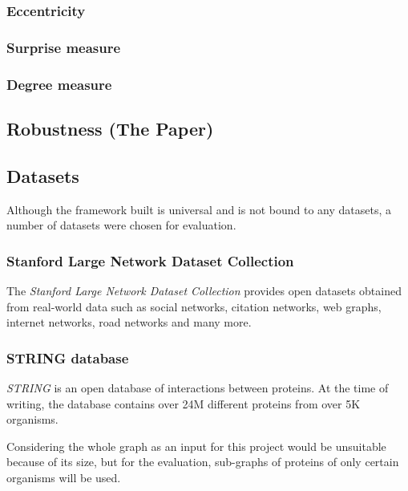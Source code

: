         \subsubsection{Eccentricity}
        \subsubsection{Surprise measure}
        \subsubsection{Degree measure}



    
    \subsection{Robustness (The Paper)}
    
    \subsection{Datasets}

        Although the framework built is universal and is not bound to any datasets, a number of datasets were chosen for evaluation.
        
        \subsubsection{Stanford Large Network Dataset Collection}
        
            The \textit{Stanford Large Network Dataset Collection}\cite{Large2016} provides open datasets obtained from real-world data such as social networks, citation networks, web graphs, internet networks, road networks and many more.
        
        \subsubsection{STRING database}
        
            \textit{STRING}\cite{Szklarczyk2019} is an open database of interactions between proteins. At the time of writing, the database contains over 24M different proteins from over 5K organisms.
            
            Considering the whole graph as an input for this project would be unsuitable because of its size, but for the evaluation, sub-graphs of proteins of only certain organisms will be used.
            
